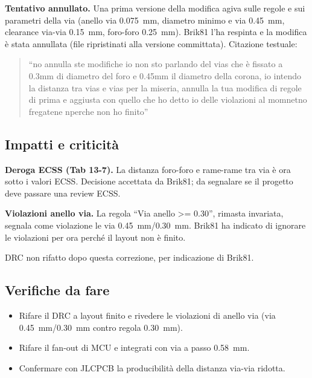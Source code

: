 \textbf{Tentativo annullato.} Una prima versione della modifica agiva sulle regole e sui parametri della via (anello via \SI{0,075}{\milli\metre}, diametro minimo e via  \SI{0,45}{\milli\metre}, clearance via-via \SI{0,15}{\milli\metre}, foro-foro \SI{0,25}{\milli\metre}). Brik81 l'ha respinta e la modifica è stata annullata (file ripristinati alla versione committata). Citazione testuale:
\begin{quote}
``no annulla ste modifiche io non sto parlando del vias che è fissato a 0.3mm di diametro del foro e 0.45mm il diametro della corona, io intendo la distanza tra vias e vias per la miseria, annulla la tua modifica di regole di prima e aggiusta con quello che ho detto io delle violazioni al momnetno fregatene nperche non ho finito''
\end{quote}

\subsection{Impatti e criticità}
\begin{critbox}
\textbf{Deroga ECSS (Tab 13-7).} La distanza foro-foro e rame-rame tra via è ora sotto i valori ECSS. Decisione accettata da Brik81; da segnalare se il progetto deve passare una review ECSS.
\end{critbox}
\begin{notebox}
\textbf{Violazioni anello via.} La regola ``Via anello >= 0.30'', rimasta invariata, segnala come violazione le via \SI{0,45}{\milli\metre}/\SI{0,30}{\milli\metre}. Brik81 ha indicato di ignorare le violazioni per ora perché il layout non è finito.
\end{notebox}
\begin{notebox}
DRC non rifatto dopo questa correzione, per indicazione di Brik81.
\end{notebox}

\subsection{Verifiche da fare}
\begin{itemize}
  \item Rifare il DRC a layout finito e rivedere le violazioni di anello via (via \SI{0,45}{\milli\metre}/\SI{0,30}{\milli\metre} contro regola \SI{0,30}{\milli\metre}).
  \item Rifare il fan-out di MCU e integrati con via a passo \SI{0,58}{\milli\metre}.
  \item Confermare con JLCPCB la producibilità della distanza via-via ridotta.
\end{itemize}
